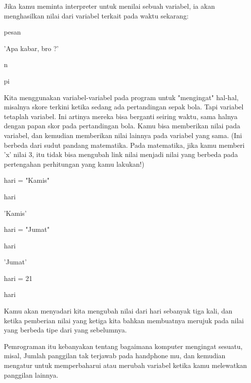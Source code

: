 \vspace{12pt}
\vspace{12pt}
\noindent 
Jika kamu meminta interpreter untuk menilai sebuah variabel, ia akan menghasilkan nilai dari variabel terkait pada waktu sekarang: \par
\vspace{12pt}
\noindent 
pesan \par
\noindent 
'Apa kabar, bro ?' \par
\noindent 
n \par
{} \par
\noindent 
pi \par
{} \par
\vspace{12pt}
\noindent 
Kita menggunakan variabel-variabel pada program untuk "mengingat" hal-hal, misalnya skore terkini ketika sedang ada pertandingan sepak bola. Tapi variabel tetaplah $  $variabel. Ini artinya mereka bisa berganti seiring waktu, sama halnya dengan papan skor pada pertandingan bola. Kamu bisa memberikan nilai pada variabel, dan kemudian memberikan nilai lainnya pada variabel yang sama. (Ini berbeda dari sudut pandang matematika. Pada matematika, jika kamu memberi 'x' nilai 3, itu tidak bisa mengubah link nilai menjadi nilai yang berbeda pada pertengahan perhitungan yang kamu lakukan!) \par
\vspace{12pt}
\noindent 
hari = "Kamis" \par
\noindent 
hari \par
\noindent 
'Kamis' \par
\noindent 
hari = "Jumat" \par
\noindent 
hari \par
\noindent 
'Jumat' \par
\noindent 
hari = 21 \par
\noindent 
hari \par
{} \par
\vspace{12pt}
\noindent 
Kamu akan menyadari kita mengubah nilai dari $  $hari $  $sebanyak tiga kali, dan ketika pemberian nilai yang ketiga kita bahkan membuatnya merujuk pada nilai yang berbeda tipe dari yang sebelumnya. \par
\vspace{12pt}
\noindent 
Pemrograman itu kebanyakan tentang bagaimana komputer mengingat sesuatu, misal, $  $Jumlah panggilan tak terjawab pada handphone mu, $  $dan kemudian mengatur untuk memperbaharui atau merubah variabel ketika kamu melewatkan panggilan lainnya. \par
